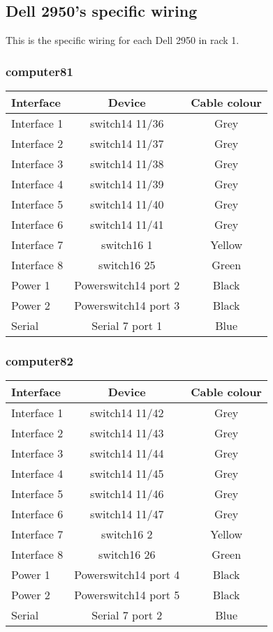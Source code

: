 \subsection{Dell 2950's specific wiring}

This is the specific wiring for each Dell 2950 in rack 1.

%

\subsubsection{computer81}

\begin{table}[H]
\begin{tabular}{|l|c|c|}\hline
Interface & Device & Cable colour \\ \hline
Interface 1 & switch14 11/36 & Grey \\
Interface 2 & switch14 11/37 & Grey \\
Interface 3 & switch14 11/38 & Grey \\
Interface 4 & switch14 11/39 & Grey \\
Interface 5 & switch14 11/40 & Grey \\
Interface 6 & switch14 11/41 & Grey \\
Interface 7 & switch16 1 & Yellow \\
Interface 8 & switch16 25 & Green \\
Power 1 & Powerswitch14 port 2 & Black \\
Power 2 & Powerswitch14 port 3 & Black \\
Serial & Serial 7 port 1 & Blue \\ \hline
\end{tabular}
\end{table}%


\subsubsection{computer82}

\begin{table}[H]
\begin{tabular}{|l|c|c|}\hline
Interface & Device & Cable colour \\ \hline
Interface 1 & switch14 11/42 & Grey \\
Interface 2 & switch14 11/43 & Grey \\
Interface 3 & switch14 11/44 & Grey \\
Interface 4 & switch14 11/45 & Grey \\
Interface 5 & switch14 11/46 & Grey \\
Interface 6 & switch14 11/47 & Grey \\
Interface 7 & switch16 2 & Yellow \\
Interface 8 & switch16 26 & Green \\
Power 1 & Powerswitch14 port 4 & Black \\
Power 2 & Powerswitch14 port 5 & Black \\
Serial & Serial 7 port 2 & Blue \\ \hline
\end{tabular}
\end{table}

